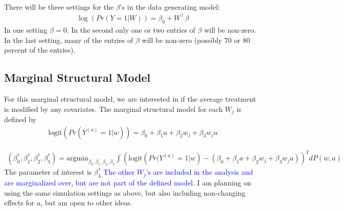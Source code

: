 \documentclass{article}
\newcommand{\sh}{\textcolor{red}}
\begin{document}
There will be three settings for the $\beta$'s in the data generating model:
\begin{align*}
    \log(Pr(Y = 1 | W)) = \beta_0 + W^\top \beta
\end{align*}
In one setting $\beta = 0$.  In the second only one or two entries of $\beta$ will be non-zero.  In the last setting, many of the entries of $\beta$ will be non-zero (possibly $70$ or $80$ percent of the entries). 

\subsection{Marginal Structural Model}
For this marginal structural model, we are interested in if the average treatment is modified by any covariates.  The marginal structural model for each $W_j$ is defined by
\begin{align*}
\text{logit}\left(Pr(Y^{(a)} = 1 | w)\right) = \beta_0 + \beta_1 a + \beta_2 w_j + \beta_3 w_j a
\end{align*}

\begin{align*}
(\beta_0^*, \beta_1^*, \beta_2^*, \beta_3^*) = \text{argmin}_{\beta_0, \beta_1, \beta_2, \beta_3}\int\left(\text{logit}\left(Pr(Y^{(a)} = 1 | w\right) - (\beta_0 + \beta_1 a + \beta_2w_j + \beta_3 w_j a) \right)^2 dP(w, a)
\end{align*}
The parameter of interest is $\beta_3^*$
\textcolor{blue}{The other $W_j$'s are included in the analysis and are marginalized over, but are not part of the defined model.} I am planning on using the same simulation settings as above, but also including non-changing effects for $a$, but am open to other ideas.
\end{document}
